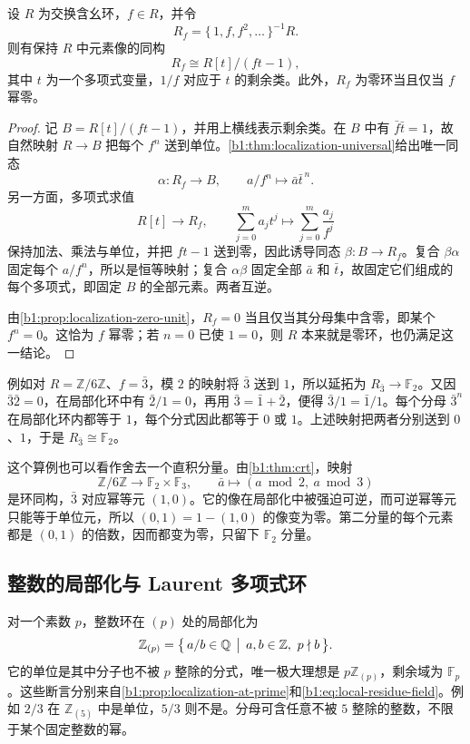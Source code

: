 \begin{proposition}\label{b1:prop:single-element-localization}
	设 \(R\) 为交换含幺环，\(f\in R\)，并令
	\[
		R_f=\{\,1,f,f^2,\ldots\,\}^{-1}R.
	\]
	则有保持 \(R\) 中元素像的同构
	\[
		R_f\cong R[t]/(ft-1),
	\]
	其中 \(t\) 为一个多项式变量，\(1/f\) 对应于 \(t\) 的剩余类。此外，\(R_f\) 为零环当且仅当 \(f\) 幂零。
\end{proposition}
\begin{proof}
	记 \(B=R[t]/(ft-1)\)，并用上横线表示剩余类。在 \(B\) 中有 \(\bar f\bar t=1\)，故自然映射 \(R\rightarrow B\) 把每个 \(f^n\) 送到单位。\cref{b1:thm:localization-universal}给出唯一同态
	\[
		\alpha:R_f\longrightarrow B,\qquad a/f^n\longmapsto\bar a\bar t^{\,n}.
	\]
	另一方面，多项式求值
	\[
		R[t]\longrightarrow R_f,\qquad \sum_{j=0}^m a_jt^j\longmapsto\sum_{j=0}^m\frac{a_j}{f^j}
	\]
	保持加法、乘法与单位，并把 \(ft-1\) 送到零，因此诱导同态 \(\beta:B\rightarrow R_f\)。复合 \(\beta\alpha\) 固定每个 \(a/f^n\)，所以是恒等映射；复合 \(\alpha\beta\) 固定全部 \(\bar a\) 和 \(\bar t\)，故固定它们组成的每个多项式，即固定 \(B\) 的全部元素。两者互逆。

	由\cref{b1:prop:localization-zero-unit}，\(R_f=0\) 当且仅当其分母集中含零，即某个 \(f^n=0\)。这恰为 \(f\) 幂零；若 \(n=0\) 已使 \(1=0\)，则 \(R\) 本来就是零环，也仍满足这一结论。
\end{proof}

例如对 \(R=\mathbb Z/6\mathbb Z\)、\(f=\bar3\)，模 \(2\) 的映射将 \(\bar3\) 送到 \(1\)，所以延拓为 \(R_{\bar3}\rightarrow\mathbb F_2\)。又因 \(\bar3\bar2=0\)，在局部化环中有 \(\bar2/1=0\)，再用 \(\bar3=\bar1+\bar2\)，便得 \(\bar3/1=\bar1/1\)。每个分母 \(\bar3^n\) 在局部化环内都等于 \(1\)，每个分式因此都等于 \(0\) 或 \(1\)。上述映射把两者分别送到 \(0\)、\(1\)，于是 \(R_{\bar3}\cong\mathbb F_2\)。

\ProseParagraphBreak
这个算例也可以看作舍去一个直积分量。由\cref{b1:thm:crt}，映射
\[
	\mathbb Z/6\mathbb Z\longrightarrow\mathbb F_2\times\mathbb F_3, \qquad \bar a\longmapsto(a\bmod2,\ a\bmod3)
\]
是环同构，\(\bar3\) 对应幂等元 \((1,0)\)。它的像在局部化中被强迫可逆，而可逆幂等元只能等于单位元，所以 \((0,1)=1-(1,0)\) 的像变为零。第二分量的每个元素都是 \((0,1)\) 的倍数，因而都变为零，只留下 \(\mathbb F_2\) 分量。

\subsection{整数的局部化与 Laurent 多项式环}
\label{b1:subsec:1303:03}

对一个素数 \(p\)，整数环在 \((p)\) 处的局部化为
\[
	\mathbb Z_{(p)} =\bigl\{\,a/b\in\mathbb Q\,\bigm|\,a,b\in\mathbb Z,\ p\nmid b\,\bigr\}.
\]
它的单位是其中分子也不被 \(p\) 整除的分式，唯一极大理想是 \(p\mathbb Z_{(p)}\)，剩余域为 \(\mathbb F_p\)。这些断言分别来自\cref{b1:prop:localization-at-prime}和\eqref{b1:eq:local-residue-field}。例如 \(2/3\) 在 \(\mathbb Z_{(5)}\) 中是单位，\(5/3\) 则不是。分母可含任意不被 \(5\) 整除的整数，不限于某个固定整数的幂。

